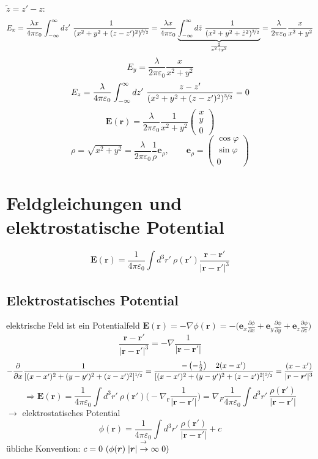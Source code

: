 \documentclass[titlepage,11pt,a4paper,ngerman]{report}
\newcommand{\prt}[2]{\frac{\partial #1}{\partial #2}}
\newcommand{\kq}{\frac{1}{4\pi\epsilon_0}}
\newcommand{\intt}[2]{\int_{#1}^{#2}}
\renewcommand{\vec}[1]{\boldsymbol{#1}}
\renewcommand{\epsilon}{\varepsilon}
\begin{document}
$\tilde{z} = z' - z$:
$$E_x = \frac{\lambda x}{4 \pi \epsilon_0}\intt{-\infty}{\infty}dz'\ \frac{1}{(x^2 + y^2 + (z-z')^2)^{\nicefrac{3}{2}}} = \frac{\lambda x}{4 \pi \epsilon_0}\underbrace{\intt{-\infty}{\infty}d\tilde{z}\ \frac{1}{(x^2 + y^2 + \tilde{z}^2)^{\nicefrac{3}{2}}}}_{\frac{2}{x^2 + y^2}} = \frac{\lambda}{2 \pi \epsilon_0} \frac{x}{x^2 + y^2}$$
$$E_y = \frac{\lambda}{2 \pi \epsilon_0}\frac{x}{x^2 + y^2}$$
$$E_z = \frac{\lambda}{4 \pi \epsilon_0} \intt{-\infty}{\infty}dz'\ \frac{z-z'}{(x^2 + y^2 + (z-z')^2)^{\nicefrac{3}{2}}} = 0$$
$$\vec{E}(\vec{r}) = \frac{\lambda}{2 \pi \epsilon_0} \frac{1}{x^2 + y^2} \begin{pmatrix}x\\ y\\ 0\end{pmatrix}$$
$$\rho = \sqrt{x^2 + y^2} = \frac{\lambda}{2 \pi \epsilon_0} \frac{1}{\rho}\vec{e}_\rho, \qquad \vec{e}_\rho = \begin{pmatrix}\cos \varphi\\ \sin \varphi\\ 0\end{pmatrix}$$

\section{Feldgleichungen und elektrostatische Potential}
$$\vec{E}(\vec{r}) = \kq \int d^3 r'\ \rho(\vec{r}') \frac{\vec{r} - \vec{r}'}{|\vec{r} - \vec{r}'|^3}$$
\subsection{Elektrostatisches Potential}
elektrische Feld ist ein Potentialfeld $\vec{E}(\vec{r}) = - \nabla\phi(\vec{r}) = - \bigg( \vec{e}_x \prt{\phi}{x} + \vec{e}_y \prt{\phi}{y} + \vec{e}_z \prt{\phi}{z}\bigg)$
$$\frac{\vec{r} - \vec{r}'}{|\vec{r} - \vec{r}'|^3} = -\nabla\frac{1}{|\vec{r}-\vec{r}'|}$$
$$-\prt{}{x} \frac{1}{[(x-x')^2 + (y-y')^2 + (z-z')^2]^{\nicefrac{1}{2}}} =  \frac{- \left(-\frac{1}{2}\right) \quad 2(x-x')}{[(x-x')^2 + (y-y')^2 + (z-z')^2]^{\nicefrac{3}{2}}} = \frac{(x-x')}{|\vec{r} - \vec{r}'|^3}$$
$$\Rightarrow \vec{E}(\vec{r}) = \kq \int d^3 r'\ \rho(\vec{r}') \bigg(-\nabla_{\vec{r}} \frac{1}{|\vec{r} - \vec{r}'|} \bigg) = \nabla_F \kq \int d^3 r'\ \frac{\rho(\vec{r}')}{|\vec{r} - \vec{r}'|}$$
$\rightarrow$ elektrostatisches Potential
$$\phi(\vec{r}) = \kq \int d^3 r'\ \frac{\rho(\vec{r}')}{|\vec{r} - \vec{r}'|} + c$$
übliche Konvention: $c = 0\ (\phi(\vec{r})\buildrel{\rightarrow}\over{|\vec{r}| \to \infty} 0)$
\end{document}
